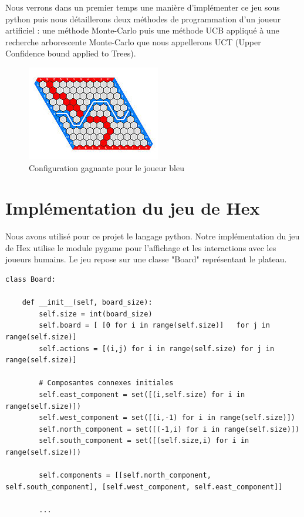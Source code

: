 \documentclass[a4paper]{article}
\theoremstyle{definition}
\begin{document}
Nous verrons dans un premier temps une manière d'implémenter ce jeu sous python puis nous détaillerons deux méthodes de programmation d'un joueur artificiel : une méthode Monte-Carlo puis une méthode UCB appliqué à une recherche arborescente Monte-Carlo que nous appellerons UCT (Upper Confidence bound applied to Trees).

\begin{figure}[h]
\centering
\includegraphics[scale=1]{11x11_gagnant.jpg}
\caption{Configuration gagnante pour le joueur bleu}
\end{figure}




\clearpage

\section{Implémentation du jeu de Hex}

Nous avons utilisé pour ce projet le langage python. Notre implémentation du jeu de Hex utilise le module pygame pour l'affichage et les interactions avec les joueurs humains. Le jeu repose sur une classe "Board" représentant le plateau.

\begin{lstlisting}
class Board:

    def __init__(self, board_size):
        self.size = int(board_size)
        self.board = [ [0 for i in range(self.size)]   for j in range(self.size)]
        self.actions = [(i,j) for i in range(self.size) for j in range(self.size)]

        # Composantes connexes initiales
        self.east_component = set([(i,self.size) for i in range(self.size)])
        self.west_component = set([(i,-1) for i in range(self.size)])
        self.north_component = set([(-1,i) for i in range(self.size)])
        self.south_component = set([(self.size,i) for i in range(self.size)])
	 
        self.components = [[self.north_component, self.south_component], [self.west_component, self.east_component]]

        ...
\end{lstlisting}
\end{document}
